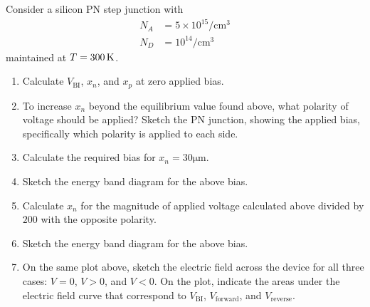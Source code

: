 \documentclass[fleqn, a4paper, 10pt, oneside]{amsart}
\theoremstyle{definition}
\theoremstyle{theorem}
\begin{document}
\begin{question}
	Consider a silicon PN step junction with
	\begin{align*}
		N_A &= 5 \times 10^{15} \si{\per\centi\metre\cubed}\\
		N_D &= 10^{14} \si{\per\centi\metre\cubed}
	\end{align*}
	maintained at $T = 300 \kelvin$.
	\begin{enumerate}
		\item
			Calculate $V_{\text{BI}}$, $x_n$, and $x_p$ at zero applied bias.
		\item
			To increase $x_n$ beyond the equilibrium value found above, what polarity of voltage should be applied?
			Sketch the PN junction, showing the applied bias, specifically which polarity is applied to each side.
		\item
			Calculate the required bias for $x_n = 30 \si{\micro\metre}$.
		\item
			Sketch the energy band diagram for the above bias.
		\item
			Calculate $x_n$ for the magnitude of applied voltage calculated above divided by $200$ with the opposite polarity.
		\item
			Sketch the energy band diagram for the above bias.
		\item
			On the same plot above, sketch the electric field across the device for all three cases: $V = 0$, $V > 0$, and $V < 0$.
			On the plot, indicate the areas under the electric field curve that correspond to $V_{\text{BI}}$, $V_{\text{forward}}$, and $V_{\text{reverse}}$.
	\end{enumerate}
\end{question}
\end{document}
